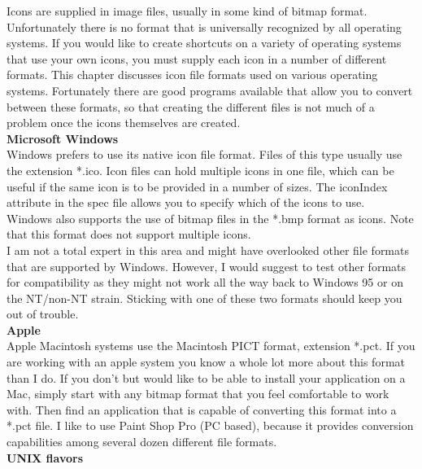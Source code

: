 Icons are supplied in image files, usually in some kind of bitmap
format. Unfortunately there is no format that is universally recognized
by all operating systems. If you would like to create shortcuts on a
variety of operating systems that use your own icons, you must supply
each icon in a number of different formats. This chapter discusses icon
file formats used on various operating systems. Fortunately there are
good programs available that allow you to convert between these formats,
so that creating the different files is not much of a problem once the
icons themselves are created.\\

\textbf{Microsoft Windows}\\

Windows prefers to use its native icon file format. Files of this type
usually use the extension *.ico. Icon files can hold multiple icons in
one file, which can be useful if the same icon is to be provided in a
number of sizes. The iconIndex attribute in the spec file allows you to
specify which of the icons to use.\\

Windows also supports the use of bitmap files in the *.bmp format as
icons. Note that this format does not support multiple icons.\\

I am not a total expert in this area and might have overlooked other file
formats that are supported by Windows. However, I would suggest to test
other formats for compatibility as they might not work all the way back
to Windows 95 or on the NT/non-NT strain. Sticking with one of these two
formats should keep you out of trouble.\\

\textbf{Apple}\\

Apple Macintosh systems use the Macintosh PICT format, extension *.pct.
If you are working with an apple system you know a whole lot more about
this format than I do. If you don't but would like to be able to install
your application on a Mac, simply start with any bitmap format that you
feel comfortable to work with. Then find an application that is capable
of converting this format into a *.pct file. I like to use Paint Shop
Pro (PC based), because it provides conversion capabilities among
several dozen different file formats.\\

\textbf{UNIX flavors}\\


